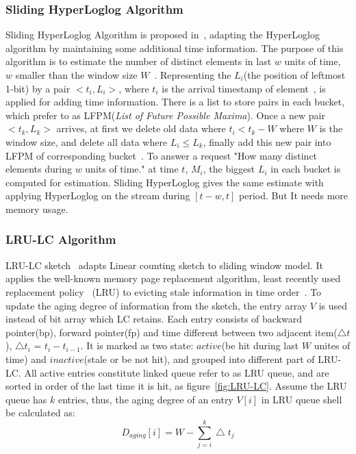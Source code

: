 \subsubsection{Sliding HyperLoglog Algorithm}
Sliding HyperLoglog Algorithm is proposed in~\cite{chabchoub2010sliding},
adapting the HyperLoglog algorithm by maintaining some additional time
information. The purpose of this algorithm is to estimate the number of distinct
elements in last $w$ units of time, $w$ smaller than the window size $W$~\cite{chabchoub2010sliding}.
Representing the $L_i$(the position of leftmost 1-bit) by a pair $<t_i, L_i>$,
where $t_i$ is the arrival timestamp of element~\cite{chabchoub2010sliding}, is applied for
adding time information. There is a list to store pairs in each bucket, which
prefer to as LFPM(\emph{List of Future Possible Maxima}). Once a new pair
$<t_k, L_k>$ arrives, at first we delete old data where $t_i < t_k - W$ where
$W$ is the window size, and delete all data where $L_i \leq L_k$, finally add
this new pair into LFPM of corresponding bucket~\cite{chabchoub2010sliding}. To
answer a request "How many distinct elements during $w$ units of time." at time
$t$, $M_i$, the biggest $L_i$ in each bucket is computed for estimation.
Sliding HyperLoglog gives the same estimate with applying HyperLoglog on the
stream during $[t-w, t]$ period. But It needs more memory usage.

\subsubsection{LRU-LC Algorithm}
LRU-LC sketch~\cite{shan2016lru} adapts Linear counting sketch to sliding window
model. It applies the well-known memory page replacement algorithm, least
recently used replacement policy~\cite{o1993lru} (LRU) to evicting stale
information in time order~\cite{shan2016lru}. To update the aging degree of
information from the sketch, the entry array $V$ is used instead of
bit array which LC retains. Each entry consists of backward pointer(bp), forward
pointer(fp) and time different between two adjacent item($\bigtriangleup t$),
$\bigtriangleup t_i$ = $t_i - t_{i-1}$. It is marked as two state: $active$(be hit
during last $W$ unites of time) and $inactive$(stale or be not hit), and grouped
into different part of LRU-LC. All active entries constitute linked queue refer
to as LRU queue, and are sorted in order of the last time it is hit, as
figure~\ref{fig:LRU-LC}. Assume the LRU queue has $k$ entries, thus, the aging
degree of an entry $V[i]$ in LRU queue shell be calculated as:
\begin{equation*}
   D_{aging}[i] = W-\sum_{j=i}^{k}\bigtriangleup t_j
\end{equation*}

